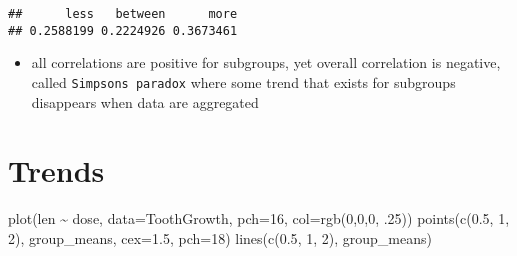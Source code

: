 \documentclass[
]{book}
\newenvironment{Shaded}{\begin{snugshade}}{\end{snugshade}}
\newcommand{\AttributeTok}[1]{\textcolor[rgb]{0.77,0.63,0.00}{#1}}
\newcommand{\DecValTok}[1]{\textcolor[rgb]{0.00,0.00,0.81}{#1}}
\newcommand{\FloatTok}[1]{\textcolor[rgb]{0.00,0.00,0.81}{#1}}
\newcommand{\FunctionTok}[1]{\textcolor[rgb]{0.00,0.00,0.00}{#1}}
\newcommand{\NormalTok}[1]{#1}
\newcommand{\OtherTok}[1]{\textcolor[rgb]{0.56,0.35,0.01}{#1}}
\newcommand{\SpecialCharTok}[1]{\textcolor[rgb]{0.00,0.00,0.00}{#1}}
\providecommand{\tightlist}{%
  \setlength{\itemsep}{0pt}\setlength{\parskip}{0pt}}
\theoremstyle{definition}
\theoremstyle{definition}
\theoremstyle{definition}
\theoremstyle{definition}
\theoremstyle{remark}
\begin{document}
\begin{Shaded}
\end{Shaded}

\begin{verbatim}
##      less   between      more 
## 0.2588199 0.2224926 0.3673461
\end{verbatim}

\begin{itemize}
\tightlist
\item
  all correlations are positive for subgroups, yet overall correlation is negative, called \texttt{Simpson\textquotesingle{}s\ paradox} where some trend that exists for subgroups disappears when data are aggregated
\end{itemize}

\hypertarget{trends}{%
\section{Trends}\label{trends}}

\begin{Shaded}
\begin{Highlighting}[]
\FunctionTok{plot}\NormalTok{(len }\SpecialCharTok{\textasciitilde{}}\NormalTok{ dose, }\AttributeTok{data=}\NormalTok{ToothGrowth, }\AttributeTok{pch=}\DecValTok{16}\NormalTok{, }\AttributeTok{col=}\FunctionTok{rgb}\NormalTok{(}\DecValTok{0}\NormalTok{,}\DecValTok{0}\NormalTok{,}\DecValTok{0}\NormalTok{, .}\DecValTok{25}\NormalTok{))}
\FunctionTok{points}\NormalTok{(}\FunctionTok{c}\NormalTok{(}\FloatTok{0.5}\NormalTok{, }\DecValTok{1}\NormalTok{, }\DecValTok{2}\NormalTok{), group\_means, }\AttributeTok{cex=}\FloatTok{1.5}\NormalTok{, }\AttributeTok{pch=}\DecValTok{18}\NormalTok{)}
\FunctionTok{lines}\NormalTok{(}\FunctionTok{c}\NormalTok{(}\FloatTok{0.5}\NormalTok{, }\DecValTok{1}\NormalTok{, }\DecValTok{2}\NormalTok{), group\_means)}
\end{Highlighting}
\end{Shaded}
\end{document}
